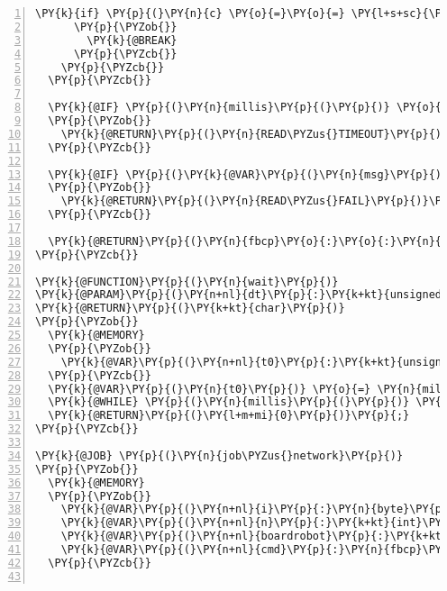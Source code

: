 \begin{Verbatim}[commandchars=\\\{\},numbers=left,firstnumber=1,stepnumber=1,frame=leftline,numbersep=0pt]
      \PY{k}{if} \PY{p}{(}\PY{n}{c} \PY{o}{=}\PY{o}{=} \PY{l+s+sc}{\PYZsq{}\PYZbs{}n\PYZsq{}} \PY{n}{or} \PY{n}{c} \PY{o}{=}\PY{o}{=} \PY{l+s+sc}{\PYZsq{}\PYZbs{}0\PYZsq{}}\PY{p}{)}
      \PY{p}{\PYZob{}}
        \PY{k}{@BREAK}
      \PY{p}{\PYZcb{}}
    \PY{p}{\PYZcb{}}
  \PY{p}{\PYZcb{}}
  
  \PY{k}{@IF} \PY{p}{(}\PY{n}{millis}\PY{p}{(}\PY{p}{)} \PY{o}{\PYZhy{}} \PY{k}{@VAR}\PY{p}{(}\PY{n}{t}\PY{p}{)} \PY{o}{\PYZgt{}}\PY{o}{=} \PY{k}{@PARAM}\PY{p}{(}\PY{n}{timeout}\PY{p}{)}\PY{p}{)}
  \PY{p}{\PYZob{}}
    \PY{k}{@RETURN}\PY{p}{(}\PY{n}{READ\PYZus{}TIMEOUT}\PY{p}{)}\PY{p}{;}
  \PY{p}{\PYZcb{}}
  
  \PY{k}{@IF} \PY{p}{(}\PY{k}{@VAR}\PY{p}{(}\PY{n}{msg}\PY{p}{)}\PY{p}{[}\PY{k}{@VAR}\PY{p}{(}\PY{n}{msg}\PY{p}{)}\PY{p}{.}\PY{n}{length}\PY{p}{(}\PY{p}{)}\PY{o}{\PYZhy{}}\PY{l+m+mi}{1}\PY{p}{]} \PY{o}{=}\PY{o}{=} \PY{l+s+sc}{\PYZsq{}\PYZbs{}0\PYZsq{}}\PY{p}{)}
  \PY{p}{\PYZob{}}
    \PY{k}{@RETURN}\PY{p}{(}\PY{n}{READ\PYZus{}FAIL}\PY{p}{)}\PY{p}{;}
  \PY{p}{\PYZcb{}}
  
  \PY{k}{@RETURN}\PY{p}{(}\PY{n}{fbcp}\PY{o}{:}\PY{o}{:}\PY{n}{parseCommand}\PY{p}{(}\PY{k}{@VAR}\PY{p}{(}\PY{n}{msg}\PY{p}{)}\PY{p}{,} \PY{o}{*}\PY{k}{@PARAM}\PY{p}{(}\PY{n}{cmd}\PY{p}{)}\PY{p}{)}\PY{o}{?}\PY{n+nl}{READ\PYZus{}SUCCESS}\PY{p}{:}\PY{n}{READ\PYZus{}FAIL}\PY{p}{)}\PY{p}{;}
\PY{p}{\PYZcb{}}

\PY{k}{@FUNCTION}\PY{p}{(}\PY{n}{wait}\PY{p}{)}
\PY{k}{@PARAM}\PY{p}{(}\PY{n+nl}{dt}\PY{p}{:}\PY{k+kt}{unsigned} \PY{k+kt}{int}\PY{p}{)}
\PY{k}{@RETURN}\PY{p}{(}\PY{k+kt}{char}\PY{p}{)}
\PY{p}{\PYZob{}}
  \PY{k}{@MEMORY}
  \PY{p}{\PYZob{}}
    \PY{k}{@VAR}\PY{p}{(}\PY{n+nl}{t0}\PY{p}{:}\PY{k+kt}{unsigned} \PY{k+kt}{int}\PY{p}{)}
  \PY{p}{\PYZcb{}}
  \PY{k}{@VAR}\PY{p}{(}\PY{n}{t0}\PY{p}{)} \PY{o}{=} \PY{n}{millis}\PY{p}{(}\PY{p}{)}\PY{p}{;}
  \PY{k}{@WHILE} \PY{p}{(}\PY{n}{millis}\PY{p}{(}\PY{p}{)} \PY{o}{\PYZhy{}} \PY{k}{@VAR}\PY{p}{(}\PY{n}{t0}\PY{p}{)} \PY{o}{\PYZlt{}} \PY{k}{@PARAM}\PY{p}{(}\PY{n}{dt}\PY{p}{)}\PY{p}{)} \PY{p}{\PYZob{}}\PY{p}{\PYZcb{}}
  \PY{k}{@RETURN}\PY{p}{(}\PY{l+m+mi}{0}\PY{p}{)}\PY{p}{;}
\PY{p}{\PYZcb{}}

\PY{k}{@JOB} \PY{p}{(}\PY{n}{job\PYZus{}network}\PY{p}{)}
\PY{p}{\PYZob{}}
  \PY{k}{@MEMORY}
  \PY{p}{\PYZob{}}
    \PY{k}{@VAR}\PY{p}{(}\PY{n+nl}{i}\PY{p}{:}\PY{n}{byte}\PY{p}{)}
    \PY{k}{@VAR}\PY{p}{(}\PY{n+nl}{n}\PY{p}{:}\PY{k+kt}{int}\PY{p}{)}
    \PY{k}{@VAR}\PY{p}{(}\PY{n+nl}{boardrobot}\PY{p}{:}\PY{k+kt}{bool}\PY{p}{)}
    \PY{k}{@VAR}\PY{p}{(}\PY{n+nl}{cmd}\PY{p}{:}\PY{n}{fbcp}\PY{o}{:}\PY{o}{:}\PY{n}{COMMAND\PYZus{}LINE}\PY{p}{)}
  \PY{p}{\PYZcb{}}


\end{Verbatim}

